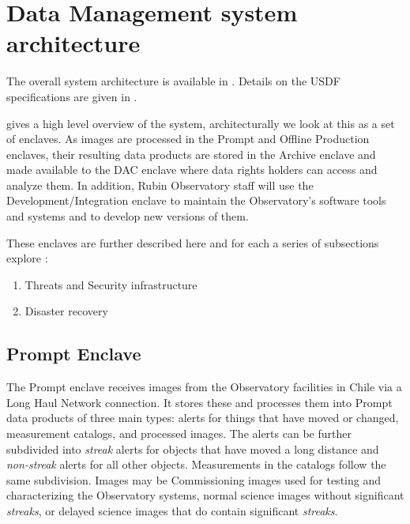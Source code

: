 

\section{Data Management system architecture} \label{sec:dparc}
The overall system architecture is available in .
Details on the \gls{USDF} specifications are given in .

 gives a high level overview of the system, architecturally we look
at this as a set of enclaves.
As images are processed in the Prompt and Offline Production enclaves, their resulting data products are stored in the \gls{Archive} enclave and made available to the DAC enclave where data rights holders can access and analyze them.
In addition, Rubin Observatory staff will use the Development/Integration enclave to maintain the Observatory's software tools and systems and to develop new versions of them.

These enclaves are further described here and for each a series of subsections explore :


\begin{enumerate}
\item Threats and Security infrastructure
\item Disaster recovery
\end{enumerate}

\subsection{Prompt \gls{Enclave}} \label{sec:promptenc}

The Prompt enclave receives images from the Observatory facilities in Chile via a Long Haul Network connection.
It stores these and processes them into Prompt data products of three main types:
alerts for things that have moved or changed, measurement catalogs, and processed images.
The alerts can be further subdivided into \emph{streak} alerts for objects that have moved a long distance and \emph{non-streak} alerts for all other objects.
Measurements in the catalogs follow the same subdivision. Images may be \gls{Commissioning} images used for testing and characterizing the Observatory systems, normal science images without significant \emph{streaks}, or delayed science images that do contain significant \emph{streaks}.

